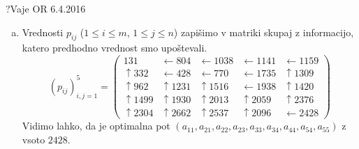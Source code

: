 \begin{naloga}{?}{Vaje OR 6.4.2016}
\begin{odgovor}
\begin{enumerate}[(a)]
\item Vrednosti $p_{ij}$ ($1 \le i \le m$, $1 \le j \le n$)
zapišimo v matriki skupaj z informacijo,
katero predhodno vrednost smo upoštevali.
$$
\left(p_{ij}\right)_{i,j=1}^5 = \left(\begin{array}{rrrrr}
          131 & \gets     804 & \gets    1038 & \gets    1141 & \gets    1159
\\
\uparrow  332 & \gets     428 & \gets     770 & \gets    1735 & \uparrow 1309
\\
\uparrow  962 & \uparrow 1231 & \uparrow 1516 & \gets    1938 & \uparrow 1420
\\
\uparrow 1499 & \uparrow 1930 & \uparrow 2013 & \uparrow 2059 & \uparrow 2376
\\
\uparrow 2304 & \uparrow 2662 & \uparrow 2537 & \uparrow 2096 & \gets    2428
\end{array}\right)
$$
Vidimo lahko, da je optimalna pot
$(a_{11}, a_{21}, a_{22}, a_{23}, a_{33}, a_{34}, a_{44}, a_{54}, a_{55})$
z vsoto $2428$.


\end{enumerate}
\end{odgovor}
\end{naloga}
